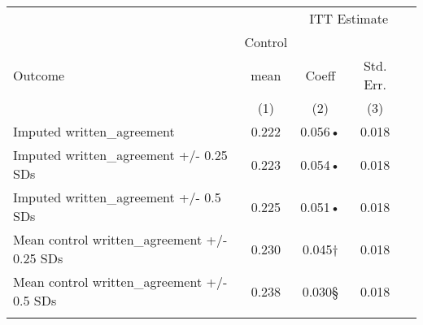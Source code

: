 \begin{tabular}{lcccc}
\hline \noalign{\smallskip} &  & \multicolumn{2}{c}{{ ITT Estimate}} & \\
\cline{3-4} & Control &  &  & \\
Outcome & mean & Coeff & Std. Err. & \\
 & (1) & (2) & (3) & \\
\noalign{\smallskip}\hline \noalign{\smallskip}Imputed written\_agreement & 0.222 & 0.056• & 0.018 & \\
Imputed written\_agreement +/- 0.25 SDs & 0.223 & 0.054• & 0.018 & \\
Imputed written\_agreement +/- 0.5 SDs & 0.225 & 0.051• & 0.018 & \\
Mean control written\_agreement +/- 0.25 SDs & 0.230 & 0.045† & 0.018 & \\
Mean control written\_agreement +/- 0.5 SDs & 0.238 & 0.030§ & 0.018 & \\
\noalign{\smallskip}\hline\end{tabular}\\
